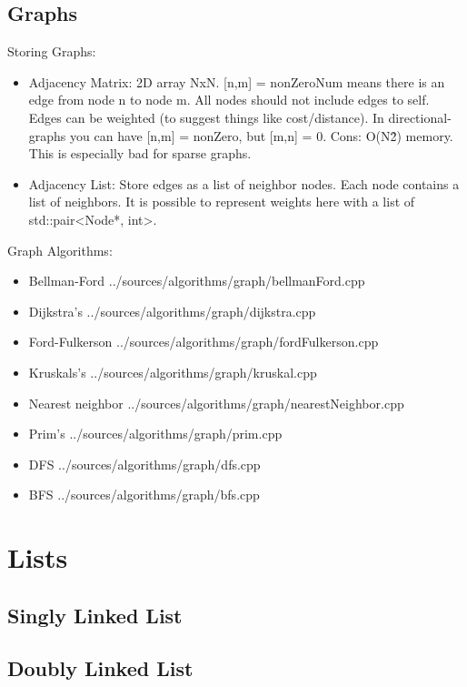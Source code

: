 \documentclass{article}
\begin{document}
\subsection{Graphs}
Storing Graphs:
\begin{itemize}
	\item Adjacency Matrix: 2D array NxN. [n,m] = nonZeroNum means there is an edge from node n to node m. All nodes should not include edges to self. Edges can be weighted (to suggest things like cost/distance). In directional-graphs you can have [n,m] = nonZero, but [m,n] = 0. Cons: O(N\^2) memory. This is especially bad for sparse graphs.
	\item Adjacency List: Store edges as a list of neighbor nodes. Each node contains a list of neighbors. It is possible to represent weights here with a list of std::pair<Node*, int>.
\end{itemize}
Graph Algorithms:
\begin{itemize}
	\item Bellman-Ford
	       {../sources/algorithms/graph/bellmanFord.cpp}
	\item Dijkstra's
	       {../sources/algorithms/graph/dijkstra.cpp}
	\item Ford-Fulkerson
	       {../sources/algorithms/graph/fordFulkerson.cpp}
	\item Kruskals's
	       {../sources/algorithms/graph/kruskal.cpp}
	\item Nearest neighbor
	       {../sources/algorithms/graph/nearestNeighbor.cpp}
	\item Prim's
	       {../sources/algorithms/graph/prim.cpp}
	\item DFS
	       {../sources/algorithms/graph/dfs.cpp}
	\item BFS
	       {../sources/algorithms/graph/bfs.cpp}
\end{itemize}
\section{Lists}
\subsection{Singly Linked List}
\subsection{Doubly Linked List}
\end{document}
